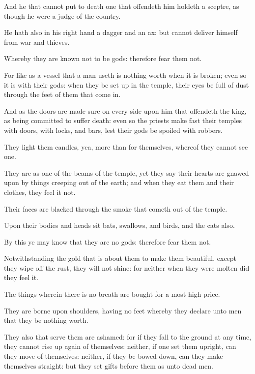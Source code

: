 {\par }{\PP {}And he that cannot put to death one that offendeth him holdeth a sceptre, as though he were a judge of the country.
\par }{\PP {}He hath also in his right hand a dagger and an ax: but cannot deliver himself from war and thieves.
\par }{\PP {}Whereby they are known not to be gods: therefore fear them not.
\par }{\PP {}For like as a vessel that a man useth is nothing worth when it is broken; even so it is with their gods: when they be set up in the temple, their eyes be full of dust through the feet of them that come in.
\par }{\PP {}And as the doors are made sure on every side upon him that offendeth the king, as being committed to suffer death: even so the priests make fast their temples with doors, with locks, and bars, lest their gods be spoiled with robbers.
\par }{\PP {}They light them candles, yea, more than for themselves, whereof they cannot see one.
\par }{\PP {}They are as one of the beams of the temple, yet they say their hearts are gnawed upon by things creeping out of the earth; and when they eat them and their clothes, they feel it not.
\par }{\PP {}Their faces are blacked through the smoke that cometh out of the temple.
\par }{\PP {}Upon their bodies and heads sit bats, swallows, and birds, and the cats also.
\par }{\PP {}By this ye may know that they are no gods: therefore fear them not.
\par }{\PP {}Notwithstanding the gold that is about them to make them beautiful, except they wipe off the rust, they will not shine: for neither when they were molten did they feel it.
\par }{\PP {}The things wherein there is no breath are bought for a most high price.
\par }{\PP {}They are borne upon shoulders, having no feet whereby they declare unto men that they be nothing worth.
\par }{\PP {}They also that serve them are ashamed: for if they fall to the ground at any time, they cannot rise up again of themselves: neither, if one set them upright, can they move of themselves: neither, if they be bowed down, can they make themselves straight: but they set gifts before them as unto dead men.
}
